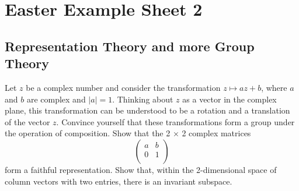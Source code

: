 \documentclass[a4paper]{article}
\begin{document}
\newpage
\section{Easter Example Sheet 2}
\subsection*{Representation Theory and more Group Theory}
\begin{qns}
Let $z$ be a complex number and consider the transformation $z\mapsto az+b$, where
$a$ and $b$ are complex and $|a| = 1$. Thinking about $z$ as a vector in the complex plane, this transformation can be understood to be a rotation and a translation of the vector $z$. Convince yourself that these transformations form a group under the operation of composition. Show that the 2 × 2 complex matrices
$$\begin{pmatrix}a&b\\0&1\\\end{pmatrix}$$
form a faithful representation. Show that, within the 2-dimensional space of column vectors with two entries, there is an invariant subspace.
\end{qns}
\end{document}
